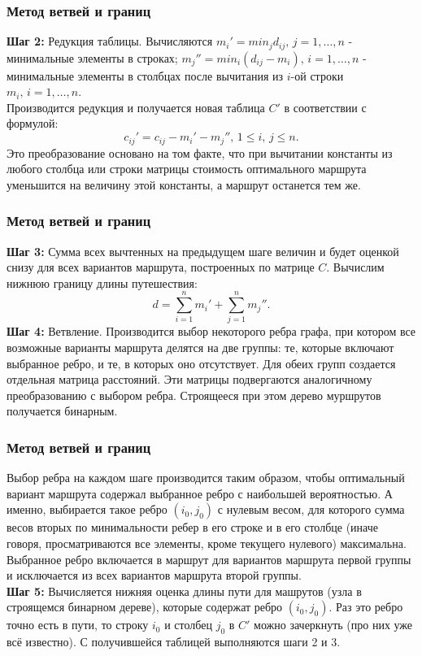 \documentclass{beamer}
\begin{document}
\begin{frame}
\frametitle{Метод ветвей и границ}
\textbf{Шаг 2:} Редукция таблицы. Вычисляются $m_i' = min_jd_{ij},\,j = 1, \ldots, n$ - минимальные элементы в строках; $m_j'' = min_i(d_{ij} - m_i),\,i = 1, \ldots, n$ - минимальные элементы в столбцах после вычитания из $i$-ой строки $m_i,\,i = 1, \ldots, n$.\\
Производится редукция и получается новая таблица $C'$ в соответствии с формулой:
$$c_{ij}' = c_{ij} - m_i' - m_j'',\,1 \leq i,\,j \leq n.$$
Это преобразование основано на том факте, что при вычитании константы из любого столбца или строки матрицы стоимость оптимального маршрута уменьшится на величину этой константы, а маршрут останется тем же. 
\end{frame}


\begin{frame}
\frametitle{Метод ветвей и границ}
\textbf{Шаг 3:} Сумма всех вычтенных на предыдущем шаге величин и будет оценкой снизу для всех вариантов маршрута, построенных по матрице $C$. Вычислим нижнюю границу длины путешествия:
$$d = \sum\limits_{i=1}^n m_i' + \sum\limits_{j=1}^n m_j''.$$
\textbf{Шаг 4:} Ветвление. Производится выбор некоторого ребра графа, при котором все возможные варианты маршрута делятся на две группы: те, которые включают выбранное ребро, и те, в которых оно отсутствует. Для обеих групп создается отдельная матрица расстояний. Эти матрицы подвергаются аналогичному преобразованию с выбором ребра. Строящееся при этом дерево муршрутов получается бинарным.
\end{frame}

\begin{frame}
\frametitle{Метод ветвей и границ}
Выбор ребра на каждом шаге производится таким образом, чтобы оптимальный
вариант маршрута содержал выбранное ребро с наибольшей вероятностью. А именно, выбирается такое ребро $(i_0, j_0)$ с нулевым весом, для которого сумма весов вторых по минимальности ребер в его строке и в его столбце (иначе говоря, просматриваются все элементы, кроме текущего нулевого) максимальна.
Выбранное ребро включается в маршрут для вариантов маршрута первой группы и
исключается из всех вариантов маршрута второй группы.\\
\textbf{Шаг 5:} Вычисляется нижняя оценка длины пути для машрутов (узла в строящемся бинарном дереве), которые содержат ребро $(i_0, j_0)$. Раз это ребро точно есть в пути, то строку $i_0$ и столбец $j_0$ в $C'$ можно зачеркнуть (про них уже всё известно). С получившейся таблицей выполняются шаги 2 и 3.
\end{frame}
\end{document}
